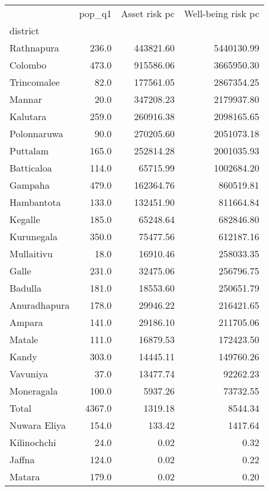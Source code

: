 \begin{tabular}{lrrr}
\toprule
{} &  pop\_q1 &  Asset risk pc &  Well-being risk pc \\
district     &         &                &                     \\
\midrule
Rathnapura   &   236.0 &      443821.60 &          5440130.99 \\
Colombo      &   473.0 &      915586.06 &          3665950.30 \\
Trincomalee  &    82.0 &      177561.05 &          2867354.25 \\
Mannar       &    20.0 &      347208.23 &          2179937.80 \\
Kalutara     &   259.0 &      260916.38 &          2098165.65 \\
Polonnaruwa  &    90.0 &      270205.60 &          2051073.18 \\
Puttalam     &   165.0 &      252814.28 &          2001035.93 \\
Batticaloa   &   114.0 &       65715.99 &          1002684.20 \\
Gampaha      &   479.0 &      162364.76 &           860519.81 \\
Hambantota   &   133.0 &      132451.90 &           811664.84 \\
Kegalle      &   185.0 &       65248.64 &           682846.80 \\
Kurunegala   &   350.0 &       75477.56 &           612187.16 \\
Mullaitivu   &    18.0 &       16910.46 &           258033.35 \\
Galle        &   231.0 &       32475.06 &           256796.75 \\
Badulla      &   181.0 &       18553.60 &           250651.79 \\
Anuradhapura &   178.0 &       29946.22 &           216421.65 \\
Ampara       &   141.0 &       29186.10 &           211705.06 \\
Matale       &   111.0 &       16879.53 &           172423.50 \\
Kandy        &   303.0 &       14445.11 &           149760.26 \\
Vavuniya     &    37.0 &       13477.74 &            92262.23 \\
Moneragala   &   100.0 &        5937.26 &            73732.55 \\
Total        &  4367.0 &        1319.18 &             8544.34 \\
Nuwara Eliya &   154.0 &         133.42 &             1417.64 \\
Kilinochchi  &    24.0 &           0.02 &                0.32 \\
Jaffna       &   124.0 &           0.02 &                0.22 \\
Matara       &   179.0 &           0.02 &                0.20 \\
\bottomrule
\end{tabular}
